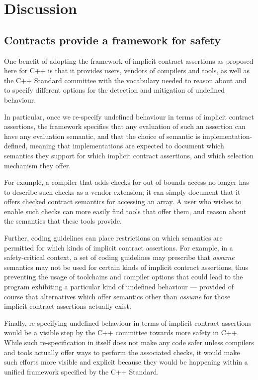\section{Discussion}

\subsection{Contracts provide a framework for safety}

One benefit of adopting the framework of implicit contract assertions as proposed here for C++ is that it provides users, vendors of compilers and tools, as well as the C++ Standard committee with the vocabulary needed to reason about and  to specify different options for the detection and mitigation of undefined behaviour.

In particular, once we re-specify undefined behaviour in terms of implicit contract assertions, the \cite{P2900R9} framework specifies that any evaluation of such an assertion can have any evaluation semantic, and that the choice of semantic is implementation-defined, meaning that implementations are expected to document which semantics they support for which implicit contract assertions, and which selection mechanism they offer.

For example, a compiler that adds checks for out-of-bounds access no longer has to describe such checks as a vendor extension; it can simply document that it offers checked contract semantics for accessing an array. A user who wishes to enable such checks can more easily find tools that offer them, and reason about the semantics that these tools provide. 

Further, coding guidelines can place restrictions on which semantics are permitted for which kinds of implicit contract assertions. For example, in a safety-critical context, a set of coding guidelines may prescribe that \emph{assume} semantics may not be used for certain kinds of implicit contract assertions, thus preventing the usage of toolchains and compiler options that could lead to the program exhibiting a particular kind of undefined behaviour --- provided of course that alternatives which offer semantics other than \emph{assume} for those implicit contract assertions actually exist.

Finally, re-specifying undefined behaviour in terms of implicit contract assertions would be a visible step by the C++ committee towards more safety in C++. While such re-specification in itself does not make any code safer unless compilers and tools actually offer ways to perform the associated checks, it would make such efforts more visible and explicit because they would be happening within a unified framework specified by the C++ Standard.
	
